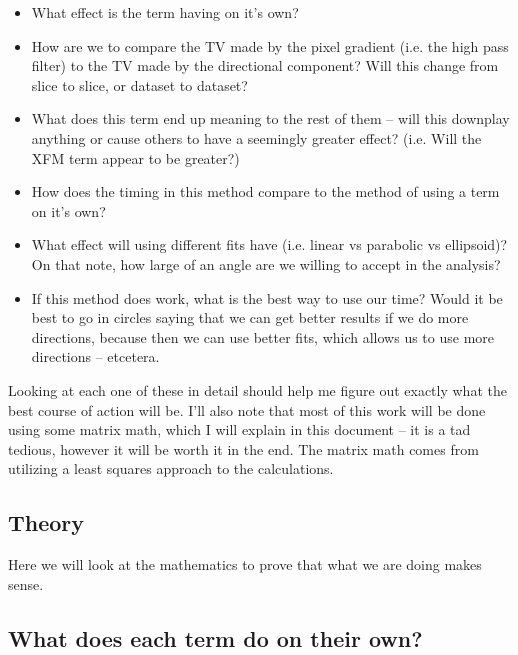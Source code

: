 \documentclass[11 pt]{article}
\begin{document}
    \begin{itemize}
      \item What effect is the term having on it's own?\\
      \item How are we to compare the TV made by the pixel gradient (i.e. the high pass filter) to the TV made by the directional component? Will this change from slice to slice, or dataset to dataset?\\
      \item What does this term end up meaning to the rest of them -- will this downplay anything or cause others to have a seemingly greater effect? (i.e. Will the XFM term appear to be greater?)\\
      \item How does the timing in this method compare to the method of using a term on it's own?\\
      \item What effect will using different fits have (i.e. linear vs parabolic vs ellipsoid)? On that note, how large of an angle are we willing to accept in the analysis?\\
      \item If this method does work, what is the best way to use our time? Would it be best to go in circles saying that we can get better results if we do more directions, because then we can use better fits, which allows us to use more directions -- etcetera.
      \end{itemize}

  Looking at each one of these in detail should help me figure out exactly what the best course of action will be. I'll also note that most of this work will be done using some matrix math, which I will explain in this document -- it is a tad tedious, however it will be worth it in the end. The matrix math comes from utilizing a least squares approach to the calculations. 

  \subsection{Theory}

    Here we will look at the mathematics to prove that what we are doing makes sense. 

  \subsection{What does each term do on their own?}
\end{document}
